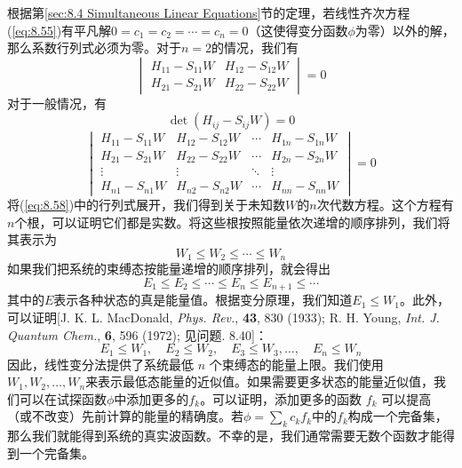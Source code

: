     根据第\ref{sec:8.4 Simultaneous Linear Equations}节的定理，若线性齐次方程(\ref{eq:8.55})有平凡解$0=c_1=c_2=\cdots=c_n=0$（这使得变分函数$\phi$为零）以外的解，那么系数行列式必须为零。对于$n=2$的情况，我们有
    \begin{equation}
        \begin{vmatrix}
            H_{11} - S_{11}W & H_{12} - S_{12}W \\
            H_{21} - S_{21}W & H_{22} - S_{22}W
        \end{vmatrix} = 0
        \label{eq:8.56}
    \end{equation}
    对于一般情况，有
    \begin{equation}
        \boxed{
            \det\left(H_{ij} - S_{ij}W\right) = 0
        }
        \label{eq:8.57}
    \end{equation}
    \begin{equation}
        \begin{vmatrix}
            H_{11} - S_{11}W & H_{12} - S_{12}W & \cdots & H_{1n} - S_{1n}W \\
            H_{21} - S_{21}W & H_{22} - S_{22}W & \cdots & H_{2n} - S_{2n}W \\
            \vdots & \vdots & \ddots & \vdots \\
            H_{n1} - S_{n1}W & H_{n2} - S_{n2}W & \cdots & H_{nn} - S_{nn}W
        \end{vmatrix} = 0
        \label{eq:8.58}
    \end{equation}
    将(\ref{eq:8.58})中的行列式展开，我们得到关于未知数$W$的$n$次代数方程。这个方程有$n$个根，可以证明它们都是实数。将这些根按照能量依次递增的顺序排列，我们将其表示为
    \begin{equation}
        W_1 \leq W_2 \leq \cdots \leq W_n
        \label{eq:8.59}
    \end{equation}
    如果我们把系统的束缚态按能量递增的顺序排列，就会得出
    \begin{equation}
        E_1 \leq E_2 \leq \cdots \leq E_n \leq E_{n+1} \leq \cdots
        \label{eq:8.60}
    \end{equation}
    其中的$E$表示各种状态的真是能量值。根据变分原理，我们知道$E_1 \leq W_1$。此外，可以证明[J. K. L. MacDonald, \textit{Phys. Rev.}, \textbf{43}, 830 (1933); R. H. Young, \textit{Int. J. Quantum Chem.}, \textbf{6}, 596 (1972); 见问题. 8.40]：
    \begin{equation}
        E_1 \leq W_1, \quad E_2 \leq W_2, \quad E_3 \leq W_3, \ldots, \quad E_n \leq W_n
        \label{eq:8.61}
    \end{equation}
    因此，线性变分法提供了系统最低 $n$ 个束缚态的能量上限。我们使用$W_1,W_2,\ldots,W_n$来表示最低态能量的近似值。如果需要更多状态的能量近似值，我们可以在试探函数$\phi$中添加更多的$f_k$。可以证明，添加更多的函数 $f_k$ 可以提高（或不改变）先前计算的能量的精确度。若$\phi = \sum_{k}c_kf_k$中的$f_k$构成一个完备集，那么我们就能得到系统的真实波函数。不幸的是，我们通常需要无数个函数才能得到一个完备集。

